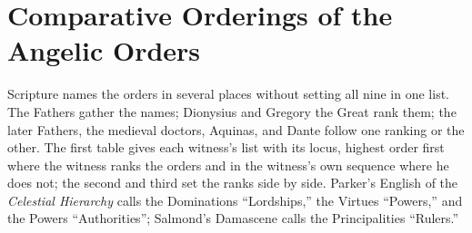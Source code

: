 \section{Comparative Orderings of the Angelic Orders}\label{app:orderings}

Scripture names the orders in several places without setting all nine in
one list. The Fathers gather the names; Dionysius and Gregory the Great
rank them; the later Fathers, the medieval doctors, Aquinas, and Dante
follow one ranking or the other. The first table gives each witness's list
with its locus, highest order first where the witness ranks the orders and
in the witness's own sequence where he does not; the second and third set
the ranks side by side. Parker's English of the \emph{Celestial Hierarchy}
calls the Dominations ``Lordships,'' the Virtues ``Powers,'' and the Powers
``Authorities''; Salmond's Damascene calls the Principalities ``Rulers.''

